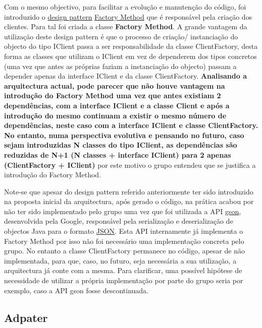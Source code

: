 \hspace{5mm} Com o mesmo objectivo, para facilitar a evolução e manutenção do código, foi introduzido o \href{https://refactoring.guru/design-patterns/what-is-pattern}{design pattern} \href{https://refactoring.guru/design-patterns/factory-method}{Factory Method} que é responsável pela criação dos clientes. Para tal foi criada a classe \textbf{Factory Method}. A grande vantagem da utilização deste design pattern é que o processo de criação/ instanciação do objecto do tipo IClient passa a ser responsabilidade da classe ClientFactory, desta forma as classes que utilizam o IClient em vez de dependerem dos tipos concretos (uma vez que antes as próprias faziam a instanciação do objecto) passam a depender apenas da interface IClient e da classe ClientFactory. \textbf{Analisando a arquitectura actual, pode parecer que não houve vantagem na introdução do Factory Method uma vez que antes existiam 2 dependências, com a interface IClient e a classe Client e após a introdução do mesmo continuam a existir o mesmo número de dependências, neste caso com a interface IClient e classe ClientFactory. No entanto, numa perspectiva evolutiva e pensando no futuro, caso sejam introduzidas N classes do tipo IClient, as dependências são reduzidas de N+1 (N classes + interface IClient) para 2 apenas (ClientFactory + IClient)} por este motivo o grupo entendeu que se justifica a introdução do Factory Method.

\hspace{5mm} Note-se que apesar do design pattern referido anteriormente ter sido introduzido na proposta inicial da arquitectura, após gerado o código, na prática acabou por não ter sido implementado pelo grupo uma vez que foi utilizada a API \href{https://github.com/google/gson}{gson}, desenvolvida pela Google, responsável pela serialização e deserialização de objectos Java para o formato \href{https://en.wikipedia.org/wiki/JSON}{JSON}. Esta API internamente já implementa o Factory Method por isso não foi necessário uma implementação concreta pelo grupo. No entanto a classe ClientFactory permanece no código, apesar de não implementada, para que, caso, no futuro, seja necessária a sua utilização, a arquitectura já conte com a mesma. Para clarificar, uma possível hipótese de necessidade de utilizar a própria implementação por parte do grupo seria por exemplo, caso a API gson fosse descontinuada. 

\subsection{Adpater}

